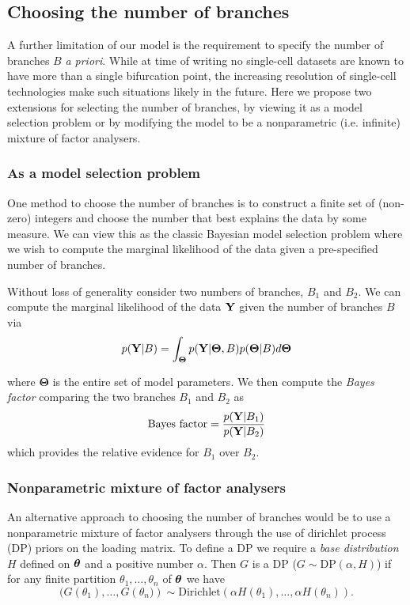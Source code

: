 \subsection{Choosing the number of branches}

A further limitation of our model is the requirement to specify the number of branches $B$ \emph{a priori}. While at time of writing no single-cell datasets are known to have more than a single bifurcation point, the increasing resolution of single-cell technologies make such situations likely in the future. Here we propose two extensions for selecting the number of branches, by viewing it as a model selection problem or by modifying the model to be a nonparametric (i.e. infinite) mixture of factor analysers.

\subsubsection{As a model selection problem}

One method to choose the number of branches is to construct a finite set of (non-zero) integers and choose the number that best explains the data by some measure. We can view this as the classic Bayesian model selection problem where we wish to compute the marginal likelihood of the data given a pre-specified number of branches.

Without loss of generality consider two numbers of branches, $B_1$ and $B_2$. We can compute the marginal likelihood of the data ${\bf Y}$ given the number of branches $B$ via
\begin{equation}
	p({\bf Y} | B) = \int_{\bm \Theta} p({\bf Y} | \bm \Theta, B) p (\bm \Theta | B) d \bm\Theta
\end{equation}

where $\bm \Theta$ is the entire set of model parameters. We then compute the \emph{Bayes factor} comparing the two branches $B_1$ and $B_2$ as
\begin{equation}
	\text{Bayes factor} = \frac{p({\bf Y} | B_1)}{p({\bf Y} | B_2)}
\end{equation}
which provides the relative evidence for $B_1$ over $B_2$.

\subsubsection{Nonparametric mixture of factor analysers}

An alternative approach to choosing the number of branches would be to use a nonparametric mixture of factor analysers through the use of dirichlet process (DP) priors on the loading matrix. To define a DP we require a \emph{base distribution} $H$ defined on $\bm{\theta}$ and a positive number $\alpha$. Then $G$ is a DP ($G \sim \text{DP}(\alpha, H)$) if for any finite partition 
$\theta_1, \ldots, \theta_n$ of $\bm{\theta}$ we have 
\begin{equation}(G(\theta_1), \ldots, G\left(\theta_n)\right) \sim \text{Dirichlet}(\alpha H(\theta_1), \ldots, \alpha H(\theta_n)).\end{equation} 

